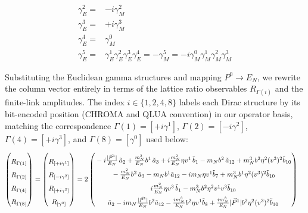 \begin{widetext}
\begin{itemize}
\begin{align}
        \gamma^{2}_{E}=&-i\gamma^{2}_{M}\\
        \gamma^{3}_{E}=&+i\gamma^{3}_{M}\\
        \gamma^{4}_{E}=&\gamma^{0}_{M}\\
        \gamma^{5}_{E}=&\gamma^{1}_{E}\gamma^{2}_{E}\gamma^{3}_{E}\gamma^{4}_{E}=-\gamma^{5}_{M}=-i\gamma^{0}_{M}\gamma^{1}_{M}\gamma^{2}_{M}\gamma^{3}_{M}
    \end{align}
\end{itemize}
Substituting the Euclidean gamma structures and mapping $P^0 \to E_N$, we rewrite the column vector entirely in terms of the lattice ratio observables $R_{\Gamma(i)}$ and the finite-link amplitudes. The index $i \in \{1,2,4,8\}$ labels each Dirac structure by its bit-encoded position (CHROMA and QLUA convention) in our operator basis, matching the correspondence $\Gamma(1)=[+i\gamma^1]$, $\Gamma(2)=[-i\gamma^2]$, $\Gamma(4)=[+i\gamma^3]$, and $\Gamma(8)=[\gamma^0]$ used below:
\begin{align}
    \begin{pmatrix}
        \rule{0pt}{16pt} R_{\Gamma(1)}\\
        \rule{0pt}{16pt} R_{\Gamma(2)}\\
        \rule{0pt}{16pt} R_{\Gamma(4)}\\
        \rule{0pt}{16pt} R_{\Gamma(8)}
    \end{pmatrix} = \begin{pmatrix}
        \rule{0pt}{16pt} R_{[+i\gamma^1]}\\
        \rule{0pt}{16pt} R_{[-i\gamma^2]}\\
        \rule{0pt}{16pt} R_{[+i\gamma^3]}\\
        \rule{0pt}{16pt} R_{[\gamma^0]}
    \end{pmatrix} &=2\begin{pmatrix}
        \rule{0pt}{16pt} -i\frac{|\vec{P}^1|}{E_N}\, \tilde a_2+  \frac{\mN^2}{E_N} \bvec^1\, \tilde a_3+ i\frac{\mN^2}{E_N} \eta v^1\, \tilde b_1 
		-  \mN  \bvec^2 \, \tilde a_{12}+  \mN^3  \bvec^2 \eta^2 (v^3)^2 \tilde b_{10}\\
         \rule{0pt}{16pt} -  \frac{\mN^2}{E_N} \bvec^2\, \tilde a_3
		-  \mN   \bvec^1  \tilde a_{12}-i \mN \eta  v^1  \tilde b_7+ \mN^3  \bvec^1 \eta^2 (v^3)^2 \tilde b_{10}\\
        \rule{0pt}{16pt} i\frac{\mN^2}{E_N} \eta v^3\, \tilde b_1-  \mN^3 \bvec^2 \eta^2 v^1 v^3\tilde b_{10}\\
         \rule{0pt}{16pt}   \tilde a_2  - i \mN  \frac{|\vec{P}^1|}{E_N} \bvec^2  \tilde a_{12}- \frac{ i \mN^3}{E_N}  \bvec^2 \eta v^1  \tilde b_8+ \frac{i \mN^3}{E_N}  |\vec{P}^1| \bvec^2 \eta^2 (v^3)^2 \tilde b_{10}

\end{pmatrix}
\end{align}
\end{widetext}
